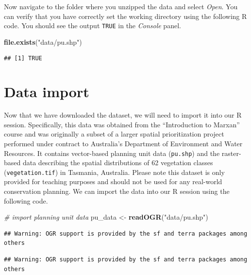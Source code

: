 \documentclass[12pt,]{book}
\newenvironment{Shaded}{\begin{snugshade}}{\end{snugshade}}
\newcommand{\CommentTok}[1]{\textcolor[rgb]{0.56,0.35,0.01}{\textit{#1}}}
\newcommand{\KeywordTok}[1]{\textcolor[rgb]{0.13,0.29,0.53}{\textbf{#1}}}
\newcommand{\NormalTok}[1]{#1}
\newcommand{\StringTok}[1]{\textcolor[rgb]{0.31,0.60,0.02}{#1}}
\begin{document}
\clearpage

Now navigate to the folder where you unzipped the data and select \emph{Open}. You can verify that you have correctly set the working directory using the following R code. You should see the output \texttt{TRUE} in the \emph{Console} panel.

\begin{Shaded}
\begin{Highlighting}[]
\KeywordTok{file.exists}\NormalTok{(}\StringTok{"data/pu.shp"}\NormalTok{)}
\end{Highlighting}
\end{Shaded}

\begin{verbatim}
## [1] TRUE
\end{verbatim}

\hypertarget{data-import}{%
\section{Data import}\label{data-import}}

Now that we have downloaded the dataset, we will need to import it into our R session. Specifically, this data was obtained from the ``Introduction to Marxan'' course and was originally a subset of a larger spatial prioritization project performed under contract to Australia's Department of Environment and Water Resources. It contains vector-based planning unit data (\texttt{pu.shp}) and the raster-based data describing the spatial distributions of 62 vegetation classes (\texttt{vegetation.tif}) in Tasmania, Australia. Please note this dataset is only provided for teaching purposes and should not be used for any real-world conservation planning. We can import the data into our R session using the following code.

\begin{Shaded}
\begin{Highlighting}[]
\CommentTok{# import planning unit data}
\NormalTok{pu_data <-}\StringTok{ }\KeywordTok{readOGR}\NormalTok{(}\StringTok{"data/pu.shp"}\NormalTok{)}
\end{Highlighting}
\end{Shaded}

\begin{verbatim}
## Warning: OGR support is provided by the sf and terra packages among others
\end{verbatim}

\begin{verbatim}
## Warning: OGR support is provided by the sf and terra packages among others
\end{verbatim}
\end{document}

